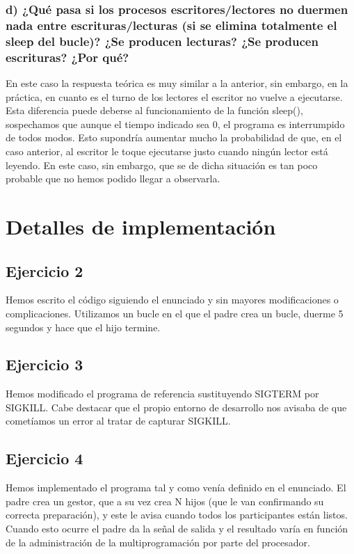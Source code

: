 \documentclass[]{article}
\begin{document}
\subsubsection*{d) ¿Qué pasa si los procesos escritores/lectores no duermen nada entre escrituras/lecturas (si se elimina totalmente el sleep del bucle)? ¿Se producen lecturas? ¿Se producen escrituras? ¿Por qué?}
En este caso la respuesta teórica es muy similar a la anterior, sin embargo, en la práctica, en cuanto es el turno de  los lectores el escritor no vuelve a ejecutarse. \\

Esta diferencia puede deberse al funcionamiento de la función sleep(), sospechamos que aunque el tiempo indicado sea 0, el programa es interrumpido de todos modos. Esto supondría aumentar mucho la probabilidad de que, en el caso anterior, al escritor le toque ejecutarse justo cuando ningún lector está leyendo. En este caso, sin embargo, que se de dicha situación es tan poco probable que no hemos podido llegar a observarla.

\section*{Detalles de implementación}
\subsection*{Ejercicio 2}
Hemos escrito el código siguiendo el enunciado y sin mayores modificaciones o complicaciones. Utilizamos un bucle en el que el padre crea un bucle, duerme 5 segundos y hace que el hijo termine.

\subsection*{Ejercicio 3}
Hemos modificado el programa de referencia sustituyendo SIGTERM por SIGKILL. Cabe destacar que el propio entorno de desarrollo nos avisaba de que cometíamos un error al tratar de capturar SIGKILL.

\subsection*{Ejercicio 4}
Hemos implementado el programa tal y como venía definido en el enunciado. El padre crea un gestor, que a su vez crea N hijos (que le van confirmando su correcta preparación), y este le avisa cuando todos los participantes están listos. Cuando esto ocurre el padre da la señal de salida y el resultado varía en función de la administración de la multiprogramación por parte del procesador. \\
\end{document}
